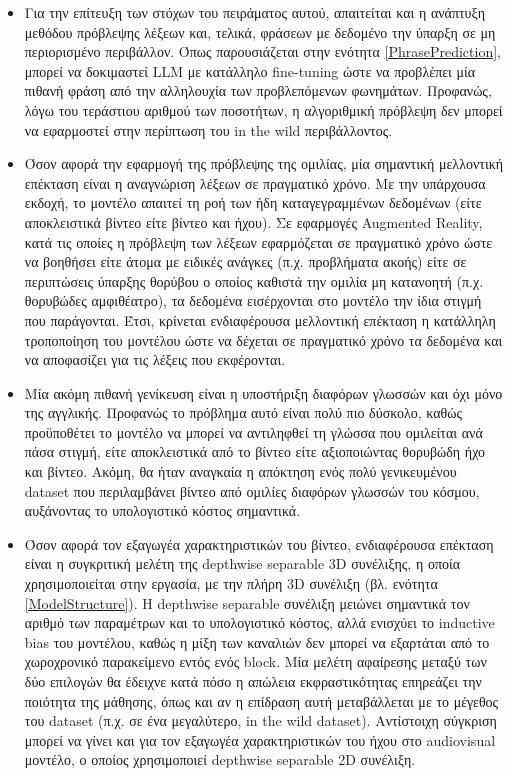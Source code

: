 \begin{itemize}
\item Για την επίτευξη των στόχων του πειράματος αυτού, απαιτείται και η ανάπτυξη μεθόδου πρόβλεψης λέξεων και, τελικά, φράσεων με δεδομένο την ύπαρξη σε μη περιορισμένο περιβάλλον. Όπως παρουσιάζεται στην ενότητα \ref{PhrasePrediction}, μπορεί να δοκιμαστεί LLM με κατάλληλο fine-tuning ώστε να προβλέπει μία πιθανή φράση από την αλληλουχία των προβλεπόμενων φωνημάτων. Προφανώς, λόγω του τεράστιου αριθμού των ποσοτήτων, η αλγοριθμική πρόβλεψη δεν μπορεί να εφαρμοστεί στην περίπτωση του in the wild περιβάλλοντος.

\item Όσον αφορά την εφαρμογή της πρόβλεψης της ομιλίας, μία σημαντική μελλοντική επέκταση είναι η αναγνώριση λέξεων σε πραγματικό χρόνο. Με την υπάρχουσα εκδοχή, το μοντέλο απαιτεί τη ροή των ήδη καταγεγραμμένων δεδομένων (είτε αποκλειστικά βίντεο είτε βίντεο και ήχου). Σε εφαρμογές Augmented Reality, κατά τις οποίες η πρόβλεψη των λέξεων εφαρμόζεται σε πραγματικό χρόνο ώστε να βοηθήσει είτε άτομα με ειδικές ανάγκες (π.χ. προβλήματα ακοής) είτε σε περιπτώσεις ύπαρξης θορύβου ο οποίος καθιστά την ομιλία μη κατανοητή (π.χ. θορυβώδες αμφιθέατρο), τα δεδομένα εισέρχονται στο μοντέλο την ίδια στιγμή που παράγονται. Έτσι, κρίνεται ενδιαφέρουσα μελλοντική επέκταση η κατάλληλη τροποποίηση του μοντέλου ώστε να δέχεται σε πραγματικό χρόνο τα δεδομένα και να αποφασίζει για τις λέξεις που εκφέρονται.

\item Μία ακόμη πιθανή γενίκευση είναι η υποστήριξη διαφόρων γλωσσών και όχι μόνο της αγγλικής. Προφανώς το πρόβλημα αυτό είναι πολύ πιο δύσκολο, καθώς προϋποθέτει το μοντέλο να μπορεί να αντιληφθεί τη γλώσσα που ομιλείται ανά πάσα στιγμή, είτε αποκλειστικά από το βίντεο είτε αξιοποιώντας θορυβώδη ήχο και βίντεο. Ακόμη, θα ήταν αναγκαία η απόκτηση ενός πολύ γενικευμένου dataset που περιλαμβάνει βίντεο από ομιλίες διαφόρων γλωσσών του κόσμου, αυξάνοντας το υπολογιστικό κόστος σημαντικά.

\item Όσον αφορά τον εξαγωγέα χαρακτηριστικών του βίντεο, ενδιαφέρουσα επέκταση είναι η συγκριτική μελέτη της depthwise separable 3D συνέλιξης, η οποία χρησιμοποιείται στην εργασία, με την πλήρη 3D συνέλιξη (βλ. ενότητα \ref{ModelStructure}). Η depthwise separable συνέλιξη μειώνει σημαντικά τον αριθμό των παραμέτρων και το υπολογιστικό κόστος, αλλά ενισχύει το inductive bias του μοντέλου, καθώς η μίξη των καναλιών δεν μπορεί να εξαρτάται από το χωροχρονικό παρακείμενο εντός ενός block. Μία μελέτη αφαίρεσης μεταξύ των δύο επιλογών θα έδειχνε κατά πόσο η απώλεια εκφραστικότητας επηρεάζει την ποιότητα της μάθησης, όπως και αν η επίδραση αυτή μεταβάλλεται με το μέγεθος του dataset (π.χ. σε ένα μεγαλύτερο, in the wild dataset). Αντίστοιχη σύγκριση μπορεί να γίνει και για τον εξαγωγέα χαρακτηριστικών του ήχου στο audiovisual μοντέλο, ο οποίος χρησιμοποιεί depthwise separable 2D συνέλιξη.


\end{itemize}
